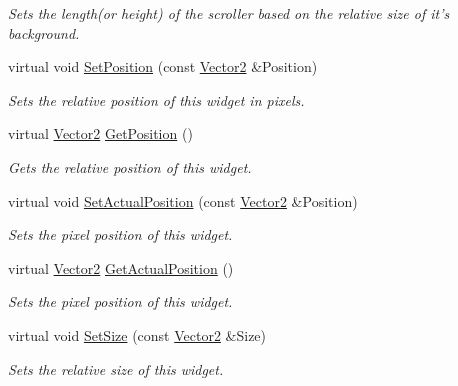 \begin{DoxyCompactItemize}
\begin{DoxyCompactList}\small\item\em Sets the length(or height) of the scroller based on the relative size of it's background. \item\end{DoxyCompactList}\item 
virtual void \hyperlink{classphys_1_1UI_1_1Scrollbar_a4a87f32e31e8e4443c4aaec46307864e}{SetPosition} (const \hyperlink{classphys_1_1Vector2}{Vector2} \&Position)
\begin{DoxyCompactList}\small\item\em Sets the relative position of this widget in pixels. \item\end{DoxyCompactList}\item 
virtual \hyperlink{classphys_1_1Vector2}{Vector2} \hyperlink{classphys_1_1UI_1_1Scrollbar_ad049af26ff2247cfcd988cb5639fa003}{GetPosition} ()
\begin{DoxyCompactList}\small\item\em Gets the relative position of this widget. \item\end{DoxyCompactList}\item 
virtual void \hyperlink{classphys_1_1UI_1_1Scrollbar_a93dfa3232185d72f274462636a833465}{SetActualPosition} (const \hyperlink{classphys_1_1Vector2}{Vector2} \&Position)
\begin{DoxyCompactList}\small\item\em Sets the pixel position of this widget. \item\end{DoxyCompactList}\item 
virtual \hyperlink{classphys_1_1Vector2}{Vector2} \hyperlink{classphys_1_1UI_1_1Scrollbar_a73337985c0f1f173e253c88705ae5d6e}{GetActualPosition} ()
\begin{DoxyCompactList}\small\item\em Sets the pixel position of this widget. \item\end{DoxyCompactList}\item 
virtual void \hyperlink{classphys_1_1UI_1_1Scrollbar_a5581675d3f250ed7270018e184b02b1d}{SetSize} (const \hyperlink{classphys_1_1Vector2}{Vector2} \&Size)
\begin{DoxyCompactList}\small\item\em Sets the relative size of this widget. \item\end{DoxyCompactList}\item 

\end{DoxyCompactItemize}
